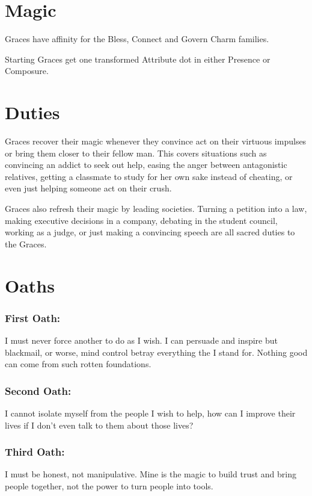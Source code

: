 \section*{Magic}

Graces have affinity for the Bless, Connect and Govern Charm families.

Starting Graces get one transformed Attribute dot in either Presence or Composure. 

\section*{Duties}
Graces recover their magic whenever they convince act on their virtuous impulses or bring them closer to their fellow man. This covers situations such as convincing an addict to seek out help, easing the anger between antagonistic relatives, getting a classmate to study for her own sake instead of cheating, or even just helping someone act on their crush. 

Graces also refresh their magic by leading societies. Turning a petition into a law, making executive decisions in a company, debating in the student council, working as a judge, or just making a convincing speech are all sacred duties to the Graces. 

\section*{Oaths}
\subsubsection*{First Oath:} I must never force another to do as I wish. I can persuade and inspire but blackmail, or worse, mind control betray everything the I stand for. Nothing good can come from such rotten foundations. 

\subsubsection*{Second Oath:} I cannot isolate myself from the people I wish to help, how can I improve their lives if I don't even talk to them about those lives? 

\subsubsection*{Third Oath:} I must be honest, not manipulative. Mine is the magic to build trust and bring people together, not the power to turn people into tools. 

